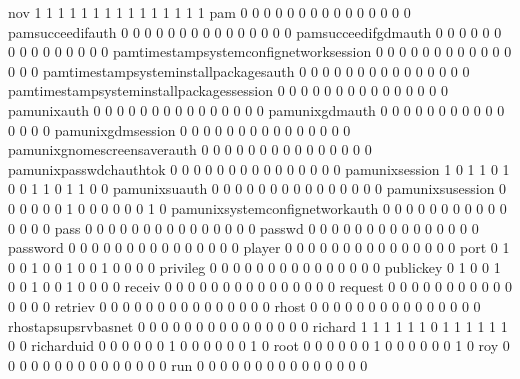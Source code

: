 \documentclass[compress,8pt]{beamer}
\begin{document}
\begin{frame}
\begin{Schunk}
  nov                                      1 1 1 1 1 1 1 1 1  1  1  1  1  1  1
  pam                                      0 0 0 0 0 0 0 0 0  0  0  0  0  0  0
  pamsucceedifauth                         0 0 0 0 0 0 0 0 0  0  0  0  0  0  0
  pamsucceedifgdmauth                      0 0 0 0 0 0 0 0 0  0  0  0  0  0  0
  pamtimestampsystemconfignetworksession   0 0 0 0 0 0 0 0 0  0  0  0  0  0  0
  pamtimestampsysteminstallpackagesauth    0 0 0 0 0 0 0 0 0  0  0  0  0  0  0
  pamtimestampsysteminstallpackagessession 0 0 0 0 0 0 0 0 0  0  0  0  0  0  0
  pamunixauth                              0 0 0 0 0 0 0 0 0  0  0  0  0  0  0
  pamunixgdmauth                           0 0 0 0 0 0 0 0 0  0  0  0  0  0  0
  pamunixgdmsession                        0 0 0 0 0 0 0 0 0  0  0  0  0  0  0
  pamunixgnomescreensaverauth              0 0 0 0 0 0 0 0 0  0  0  0  0  0  0
  pamunixpasswdchauthtok                   0 0 0 0 0 0 0 0 0  0  0  0  0  0  0
  pamunixsession                           1 0 1 1 0 1 0 0 1  1  0  1  1  0  0
  pamunixsuauth                            0 0 0 0 0 0 0 0 0  0  0  0  0  0  0
  pamunixsusession                         0 0 0 0 0 0 1 0 0  0  0  0  0  1  0
  pamunixsystemconfignetworkauth           0 0 0 0 0 0 0 0 0  0  0  0  0  0  0
  pass                                     0 0 0 0 0 0 0 0 0  0  0  0  0  0  0
  passwd                                   0 0 0 0 0 0 0 0 0  0  0  0  0  0  0
  password                                 0 0 0 0 0 0 0 0 0  0  0  0  0  0  0
  player                                   0 0 0 0 0 0 0 0 0  0  0  0  0  0  0
  port                                     0 1 0 0 1 0 0 1 0  0  1  0  0  0  0
  privileg                                 0 0 0 0 0 0 0 0 0  0  0  0  0  0  0
  publickey                                0 1 0 0 1 0 0 1 0  0  1  0  0  0  0
  receiv                                   0 0 0 0 0 0 0 0 0  0  0  0  0  0  0
  request                                  0 0 0 0 0 0 0 0 0  0  0  0  0  0  0
  retriev                                  0 0 0 0 0 0 0 0 0  0  0  0  0  0  0
  rhost                                    0 0 0 0 0 0 0 0 0  0  0  0  0  0  0
  rhostapsupsrvbasnet                      0 0 0 0 0 0 0 0 0  0  0  0  0  0  0
  richard                                  1 1 1 1 1 1 0 1 1  1  1  1  1  0  0
  richarduid                               0 0 0 0 0 0 1 0 0  0  0  0  0  1  0
  root                                     0 0 0 0 0 0 1 0 0  0  0  0  0  1  0
  roy                                      0 0 0 0 0 0 0 0 0  0  0  0  0  0  0
  run                                      0 0 0 0 0 0 0 0 0  0  0  0  0  0  0

\end{Schunk}
\end{frame}
\end{document}
